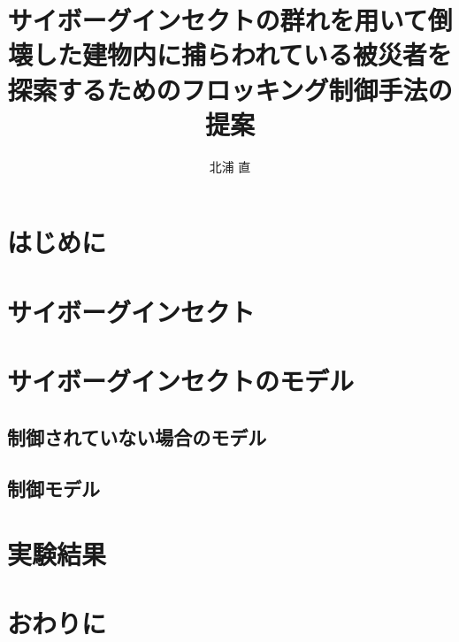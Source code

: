 \documentclass[a4paper,11pt]{jarticle}
\title{サイボーグインセクトの群れを用いて倒壊した建物内に捕らわれている被災者を探索するためのフロッキング制御手法の提案}
\author{北浦 直}
\begin{document}
	\titlepage    %
	\abstract     %
	\keyword
	\tableofcontents    %
	\section{はじめに}
	\section{サイボーグインセクト}
	\section{サイボーグインセクトのモデル}
	\subsection{制御されていない場合のモデル}
	\subsection{制御モデル}
	\section{実験結果}
	\section{おわりに}
	\begin{thebibliography}{99}
		\item 
	\end{thebibliography}
\end{document}
